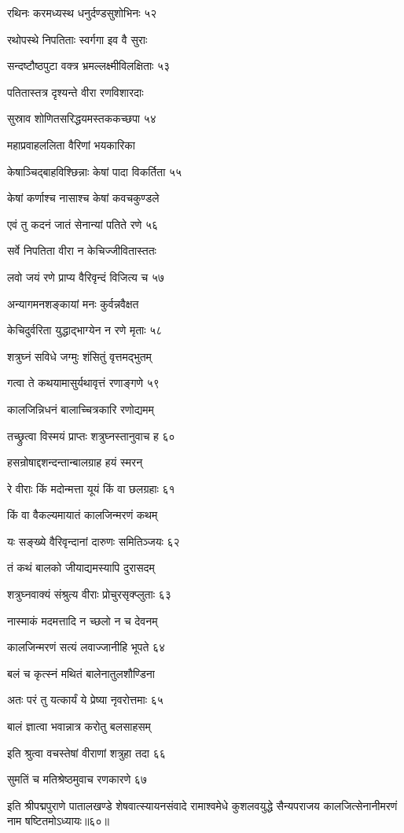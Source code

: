 रथिनः करमध्यस्थ धनुर्दण्डसुशोभिनः ५२

रथोपस्थे निपतिताः स्वर्गगा इव वै सुराः

सन्दष्टौष्ठपुटा वक्त्र भ्रमल्लक्ष्मीविलक्षिताः ५३

पतितास्तत्र दृश्यन्ते वीरा रणविशारदाः

सुस्राव शोणितसरिद्धयमस्तककच्छपा ५४

महाप्रवाहललिता वैरिणां भयकारिका

केषाञ्चिद्बाहविश्छिन्नाः केषां पादा विकर्तिता ५५

केषां कर्णाश्च नासाश्च केषां कवचकुण्डले

एवं तु कदनं जातं सेनान्यां पतिते रणे ५६

सर्वे निपतिता वीरा न केचिज्जीवितास्ततः

लवो जयं रणे प्राप्य वैरिवृन्दं विजित्य च ५७

अन्यागमनशङ्कायां मनः कुर्वन्नवैक्षत

केचिदुर्वरिता युद्धाद्भाग्येन न रणे मृताः ५८

शत्रुघ्नं सविधे जग्मुः शंसितुं वृत्तमद्भुतम्

गत्वा ते कथयामासुर्यथावृत्तं रणाङ्गणे ५९

कालजिन्निधनं बालाच्चित्रकारि रणोद्यमम्

तच्छ्रुत्वा विस्मयं प्राप्तः शत्रुघ्नस्तानुवाच ह ६०

हसन्रोषाद्दशन्दन्तान्बालग्राह हयं स्मरन्

रे वीराः किं मदोन्मत्ता यूयं किं वा छलग्रहाः ६१

किं वा वैकल्यमायातं कालजिन्मरणं कथम्

यः सङ्ख्ये वैरिवृन्दानां दारुणः समितिञ्जयः ६२

तं कथं बालको जीयाद्यमस्यापि दुरासदम्

शत्रुघ्नवाक्यं संश्रुत्य वीराः प्रोचुरसृक्प्लुताः ६३

नास्माकं मदमत्तादि न च्छलो न च देवनम्

कालजिन्मरणं सत्यं लवाज्जानीहि भूपते ६४

बलं च कृत्स्नं मथितं बालेनातुलशौण्डिना

अतः परं तु यत्कार्यं ये प्रेष्या नृवरोत्तमाः ६५

बालं ज्ञात्वा भवान्नात्र करोतु बलसाहसम्

इति श्रुत्वा वचस्तेषां वीराणां शत्रुहा तदा ६६

सुमतिं च मतिश्रेष्ठमुवाच रणकारणे ६७

इति श्रीपद्मपुराणे पातालखण्डे शेषवात्स्यायनसंवादे रामाश्वमेधे कुशलवयुद्धे सैन्यपराजय कालजित्सेनानीमरणं नाम षष्टितमोऽध्यायः॥६०॥

